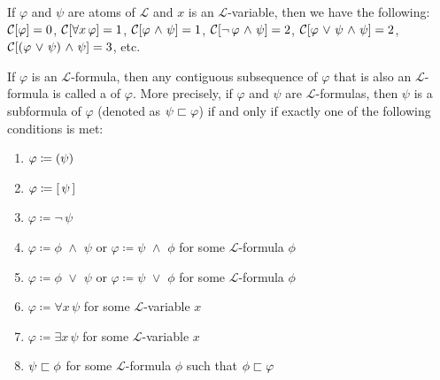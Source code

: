 \begin{eg}
    If \( \varphi \) and \( \psi \) are atoms of \( \mathcal{L} \) and \( x \) is an \( \mathcal{L} \)-variable, then we have the following:
    \( \folcomplexityofformula{\varphi} = 0 \), \( \folcomplexityofformula{\forall x \, \varphi} = 1\), \(  \folcomplexityofformula{\varphi \,\,{\land}\,\, \psi} = 1 \),
    \( \folcomplexityofformula{\lnot \, \varphi \,\,{\land}\,\, \psi} = 2 \),
    \(  \folcomplexityofformula{\varphi \,\,{\lor}\,\, \psi \,\,{\land}\,\, \psi} = 2 \),
    \( \folcomplexityofformula{\mleft( \varphi \,\,{\lor}\,\, \psi \mright) \,\,{\land}\,\, \psi} = 3 \), etc.
\end{eg}

\begin{dfn}[Subformulas]
     \label{dfn:first-order-language-subformulas}
    If \( \varphi \) is an \( \mathcal{L} \)-formula, then any contiguous subsequence of \( \varphi \) that is also an \( \mathcal{L} \)-formula
    is called a  of \( \varphi \). More precisely, if \( \varphi \) and \( \psi \) are \( \mathcal{L} \)-formulas, then
    \( \psi \) is a subformula of \( \varphi \) (denoted as \( \psi  \sqsubset  \varphi \)) if and only if exactly one of the following conditions is met:
    \begin{enumerate}[topsep=2pt,label=\textup{\texttt{(\alph*)}}]
        \item \( \varphi \coloneq \mleft( \psi \mright) \)
        \item \( \varphi \coloneq \mleft[ \, \psi \, \mright] \)
        \item \( \varphi \coloneq \lnot \, \psi \)
        \item \( \varphi \coloneq \phi \,\,{\land}\,\, \psi \) or \( \varphi \coloneq \psi \,\,{\land}\,\, \phi \) for some \( \mathcal{L} \)-formula \( \phi \)
        \item \( \varphi \coloneq \phi \,\,{\lor}\,\, \psi \) or \( \varphi \coloneq \psi \,\,{\lor}\,\, \phi\) for some \( \mathcal{L} \)-formula \( \phi \)
        \item \( \varphi \coloneq \forall x \, \psi \) for some \( \mathcal{L} \)-variable \( x \)
        \item \( \varphi \coloneq \exists x \, \psi \) for some \( \mathcal{L} \)-variable \( x \)
        \item \( \psi  \sqsubset  \phi \) for some \( \mathcal{L} \)-formula \( \phi \) such that \( \phi  \sqsubset  \varphi \)
    \end{enumerate}
\end{dfn}

